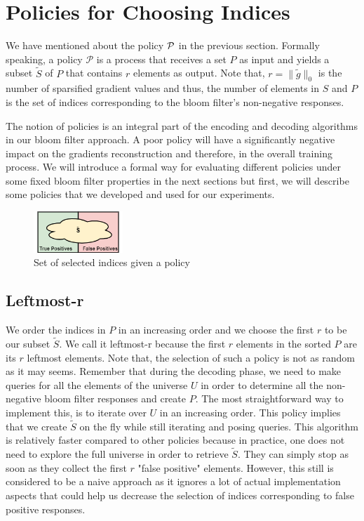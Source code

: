 
    \section{Policies for Choosing Indices}
    We have mentioned about the policy ${\cal P}$ in the previous section. 
    Formally speaking, a policy $\mathcal{P}$ is a process that receives a set $P$ as input and yields a subset $\tilde{S}$ of $P$ that contains $r$ elements as output.
    Note that,  $r=\|\tilde{g}\|_0$ is the number of sparsified gradient values and thus, the number of elements in $S$ and
    $P$ is the set of indices corresponding to the bloom filter's non-negative responses.
      
    The notion of policies is an integral part of the encoding and decoding algorithms in our bloom filter approach.
    A poor policy will have a significantly negative impact on the gradients reconstruction and therefore, in the overall training process.
    We will introduce a formal way for evaluating different policies under some fixed bloom filter properties in the next sections 
    but first, we will describe some policies that we developed and used for our experiments.
    
    \begin{figure}[h]
    \centering
    \includegraphics[width=0.3\textwidth]{thesis/figures/policy.png}
    \caption{Set  of selected indices given a policy }
    \end{figure}
    
        \subsection{Leftmost-r}
            We order the indices in $P$ in an increasing order and we choose the first $r$ to be our subset $\tilde{S}$. 
            We call it leftmost-r because the first $r$ elements in the sorted $P$ are its $r$ leftmost elements.
            Note that, the selection of such a policy is not as random as it may seems.
            Remember that during the decoding phase, we need to make queries for all the elements of the universe $U$ in order to determine all the non-negative bloom filter responses and create $P$. 
            The most straightforward way to implement this, is to iterate over $U$ in an increasing order.
            This policy implies that we create $\tilde{S}$ on the fly while still iterating and posing queries.
            This algorithm is relatively faster compared to other policies because in practice, one does not need to explore the full universe in order to retrieve $\tilde{S}$.
            They can simply stop as soon as they collect the first $r$ "false positive" elements.
            However, this still is considered to be a naive approach as it ignores a lot of actual implementation aspects that could help us decrease the selection of indices corresponding to false positive responses. 
            
